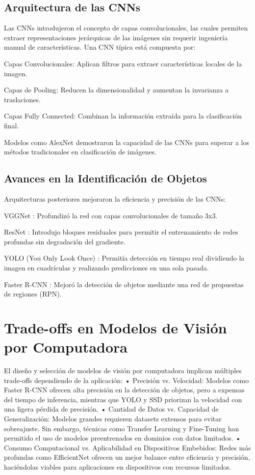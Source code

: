 \subsection{Arquitectura de las CNNs}

Las CNNs introdujeron el concepto de capas convolucionales, las cuales permiten extraer representaciones jerárquicas de las imágenes sin requerir ingeniería manual de características. Una CNN típica está compuesta por:

Capas Convolucionales: Aplican filtros para extraer características locales de la imagen.

Capas de Pooling: Reducen la dimensionalidad y aumentan la invarianza a traslaciones.

Capas Fully Connected: Combinan la información extraída para la clasificación final.

Modelos como AlexNet \cite{Krizhevsky2012}  demostraron la capacidad de las CNNs para superar a los métodos tradicionales en clasificación de imágenes.

\subsection{Avances en la Identificación de Objetos}

Arquitecturas posteriores mejoraron la eficiencia y precisión de las CNNs:

VGGNet \cite{Simonyan2014}: Profundizó la red con capas convolucionales de tamaño 3x3.

ResNet \cite{He2016}: Introdujo bloques residuales para permitir el entrenamiento de redes profundas sin degradación del gradiente.

YOLO (You Only Look Once) \cite{Redmon2016}: Permitía detección en tiempo real dividiendo la imagen en cuadrículas y realizando predicciones en una sola pasada.

Faster R-CNN \cite{Ren2015}: Mejoró la detección de objetos mediante una red de propuestas de regiones (RPN).

\section{Trade-offs en Modelos de Visión por Computadora}

El diseño y selección de modelos de visión por computadora implican múltiples trade-offs dependiendo de la aplicación:
	•	Precisión vs. Velocidad: Modelos como Faster R-CNN ofrecen alta precisión en la detección de objetos, pero a expensas del tiempo de inferencia, mientras que YOLO y SSD priorizan la velocidad con una ligera pérdida de precisión.
	•	Cantidad de Datos vs. Capacidad de Generalización: Modelos grandes requieren datasets extensos para evitar sobreajuste. Sin embargo, técnicas como Transfer Learning y Fine-Tuning han permitido el uso de modelos preentrenados en dominios con datos limitados.
	•	Consumo Computacional vs. Aplicabilidad en Dispositivos Embebidos: Redes más profundas como EfficientNet ofrecen un mejor balance entre eficiencia y precisión, haciéndolas viables para aplicaciones en dispositivos con recursos limitados.

